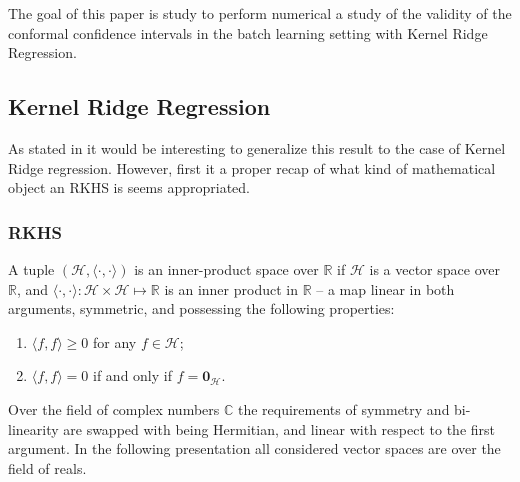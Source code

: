 \documentclass{ITaSconf}
\newcommand{\Hcal}{\mathcal{H}}
\newcommand{\Real}{\mathbb{R}}
\newcommand{\nil}{\mathbf{0}}
\newcommand{\Cplx}{\mathbb{C}}
\begin{document}
The goal of this paper is study to perform numerical a study of the validity of
the conformal confidence intervals in the batch learning setting with Kernel Ridge
Regression.



\subsection{Kernel Ridge Regression} %
\label{sub:kernel_ridge_regression}

As stated in \cite{BurVovk2014} it would be interesting to generalize this result
to the case of Kernel Ridge regression. However, first it a proper recap of what 
kind of mathematical object an RKHS is seems appropriated.

\subsubsection{RKHS} %
\label{ssub:rkhs}

A tuple $(\Hcal, \langle\cdot, \cdot\rangle)$ is an inner-product space over $\Real$
if $\Hcal$ is a vector space over $\Real$, and $\langle\cdot, \cdot\rangle : \Hcal
\times \Hcal \mapsto \Real$ is an inner product in $\Real$ -- a map linear in both
arguments, symmetric, and possessing the following properties:
\begin{enumerate}
  \item $\langle f, f\rangle\geq 0$ for any $f\in \Hcal$;
  \item $\langle f, f\rangle = 0$ if and only if $f = \nil_\Hcal$.
\end{enumerate}
Over the field of complex numbers $\Cplx$ the requirements of symmetry and bi-
linearity are swapped with being Hermitian, and linear with respect to the first
argument. In the following presentation all considered vector spaces are over the
field of reals.
\end{document}
